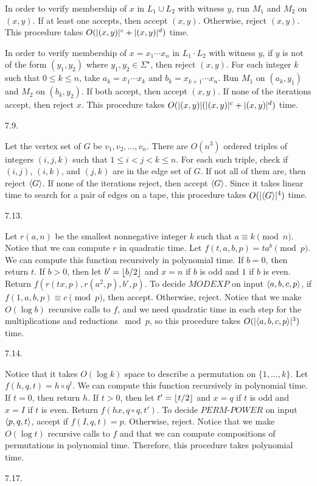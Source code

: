 In order to verify membership of $x$ in $L_1 \cup L_2$ with witness $y$,
run $M_1$ and $M_2$ on $(x, y)$.
If at least one accepts, then accept $(x, y)$.
Otherwise, reject $(x, y)$.
This procedure takes $O(\vert(x,y)\vert^c + \vert(x,y)\vert^d)$ time.

In order to verify membership of $x = x_1 \cdots x_n$ in $L_1 \cdot L_2$
with witness $y$, if $y$ is not of the form $(y_1, y_2)$
where $y_1, y_2 \in \Sigma ^\star$, then reject $(x, y)$.
For each integer $k$ such that $0 \le k \le n$,
take $a_k = x_1 \cdots x_k$ and $b_k = x_{k+1} \cdots x_n$.
Run $M_1$ on $(a_k, y_1)$ and $M_2$ on $(b_k, y_2)$.
If both accept, then accept $(x, y)$.
If none of the iterations accept, then reject $x$.
This procedure takes $O(\vert(x,y)\vert (\vert(x,y)\vert^c + \vert(x,y)\vert^d)$ time.
\bigskip
\item{7.9.}

Let the vertex set of $G$ be $v_1, v_2, \ldots, v_n$.
There are $O(n^3)$ ordered triples of integers $(i,j,k)$
such that $1 \le i < j < k \le n$.
For each such triple, check if $(i,j)$, $(i,k)$, and $(j,k)$
are in the edge set of $G$.
If not all of them are, then reject $\langle G\rangle$.
If none of the iterations reject, then accept $\langle G\rangle$.
Since it takes linear time to search for a pair of edges on a tape,
this procedure takes $O(\vert\langle G\rangle\vert ^4)$ time.
\bigskip
\item{7.13.}

Let $r(a, n)$ be the smallest nonnegative integer $k$
such that $a \equiv k \pmod n$.
Notice that we can compute $r$ in quadratic time.
Let $f(t,a,b,p) = t a^b \pmod p$.
We can compute this function recursively in polynomial time.
If $b = 0$, then return $t$.
If $b > 0$, then let $b' = \lfloor b/2\rfloor$ and
$x = n$ if $b$ is odd and $1$ if $b$ is even.
Return $f(r(tx, p), r(a^2, p), b', p)$.
To decide $MODEXP$ on input $\langle a,b,c,p\rangle$,
if $f(1,a,b,p) \equiv c \pmod p$, then accept.
Otherwise, reject.
Notice that we make $O(\log b)$ recursive calls to $f$,
and we need quadratic time in each step for the multiplications
and reductions $\bmod p$,
so this procedure takes $O(\vert\langle a,b,c,p\rangle\vert^3)$ time.
\bigskip
\item{7.14.}

Notice that it takes $O(\log k)$ space
to describe a permutation on $\{1,\ldots,k\}$.
Let $f(h,q,t) = h \circ q^t$.
We can compute this function recursively in polynomial time.
If $t = 0$, then return $h$.
If $t > 0$, then let $t' = \lfloor t/2\rfloor$ and
$x = q$ if $t$ is odd and $x = I$ if $t$ is even.
Return $f(hx, q \circ q, t')$.
To decide $PERM$-$POWER$ on input $\langle p,q,t\rangle$,
accept if $f(I,q,t) = p$.
Otherwise, reject.
Notice that we make $O(\log t)$ recursive calls to $f$
and that we can compute compositions of permutations in polynomial time.
Therefore, this procedure takes polynomial time.
\bigskip
\item{7.17.}

